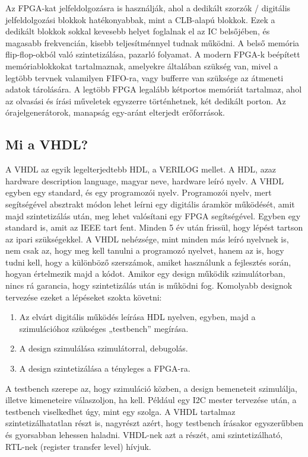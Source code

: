 \documentclass[a4paper,12pt,oneside]{book}
\begin{document}
Az FPGA-kat jelfeldolgozásra is használják, ahol a dedikált szorzók / digitális jelfeldolgozási blokkok hatékonyabbak, mint a CLB-alapú blokkok. Ezek a dedikált blokkok sokkal kevesebb helyet foglalnak el az IC belsőjében, és magasabb frekvencián, kisebb teljesítménnyel tudnak működni. A belső memória flip-flop-okból való szintetizálása, pazarló folyamat. A modern FPGA-k beépített memóriablokkokat tartalmaznak, amelyekre általában szükség van, mivel a legtöbb tervnek valamilyen FIFO-ra, vagy bufferre van szüksége az átmeneti adatok tárolására. A legtöbb FPGA legalább kétportos memóriát tartalmaz, ahol az olvasási és írási műveletek egyszerre történhetnek, két dedikált porton. Az órajelgenerátorok, manapság egy-aránt elterjedt erőforrások.

\subsection{Mi a VHDL?}

A VHDL az egyik legelterjedtebb HDL, a VERILOG mellet. A HDL, azaz hardware description language, magyar neve, hardware leíró nyelv. A VHDL egyben egy standard, és egy programozói nyelv. Programozói nyelv, mert segítségével absztrakt módon lehet leírni egy digitális áramkör működését, amit majd szintetizálás után, meg lehet valósítani egy FPGA segítségével. Egyben egy standard is, amit az IEEE tart fent. Minden 5 év után frissül, hogy lépést tartson az ipari szükségekkel. A VHDL nehézsége, mint minden más leíró nyelvnek is, nem csak az, hogy meg kell tanulni a programozó nyelvet, hanem az is, hogy tudni kell, hogy a különböző szerszámok, amiket használunk a fejlesztés során, hogyan értelmezik majd a kódot. Amikor egy design működik szimulátorban, nincs rá garancia, hogy szintetizálás után is működni fog. Komolyabb designok tervezése ezeket a lépéseket szokta követni:
\begin{enumerate}[label=(\alph*)]
	\item Az elvárt digitális működés leírása HDL nyelven, egyben, majd a szimulációhoz szükséges „testbench” megírása.
	\item A design szimulálása szimulátorral, debugolás.
	\item A design szintetizálása a tényleges a FPGA-ra. 
\end{enumerate}
A testbench szerepe az, hogy szimuláció közben, a design bemeneteit szimulálja, illetve kimeneteire válaszoljon, ha kell. Például egy I2C mester tervezése után, a testbench viselkedhet úgy, mint egy szolga. A VHDL tartalmaz szintetizálhatatlan részt is, nagyrészt azért, hogy testbench írásakor egyszerűbben és gyorsabban lehessen haladni. VHDL-nek azt a részét, ami szintetizálható, RTL-nek (register transfer level) hívjuk.
\end{document}
